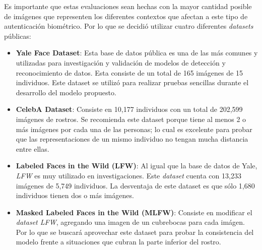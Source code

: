 \documentclass[letterpaper, 10 pt, conference]{ieeeconf}  %
\begin{document}
    Es importante que estas evaluaciones sean hechas con la mayor cantidad posible de imágenes que
    representen los diferentes contextos que afectan a este tipo de autenticación biométrico. Por
    lo que se decidió utilizar cuatro diferentes \textit{datasets} públicas:
    \begin{itemize}
        \item \textbf{Yale Face Dataset}: Esta base de datos pública es una de las más comunes y
            utilizadas para investigación y validación de modelos de detección y reconocimiento de
            datos. Esta consiste de un total de 165 imágenes de 15 individuos. Este dataset se
            utilizó para realizar pruebas sencillas durante el desarrollo del modelo propuesto.
        \item \textbf{CelebA Dataset}\cite{CELEBA}: Consiste en 10,177 individuos con un total de
            202,599 imágenes de rostros. Se recomienda este dataset porque tiene al menos 2 o más
            imágenes por cada una de las personas; lo cual es excelente para probar que las
            representaciones de un mismo individuo no tengan mucha distancia entre ellas.
        \item \textbf{Labeled Faces in the Wild (LFW)}\cite{LFW}: Al igual que la base de datos de
            Yale, \textit{LFW} es muy utilizado en investigaciones. Este \textit{dataset} cuenta
            con 13,233 imágenes de 5,749 individuos. La desventaja de este dataset es que sólo
            1,680 individuos tienen dos o más imágenes.
        \item \textbf{Masked Labeled Faces in the Wild (MLFW)}\cite{MLFW}: Consiste en modificar el
            \textit{dataset LFW}, agregando una imagen de un cubrebocas para cada imágen. Por lo
            que se buscará aprovechar este dataset para probar la consistencia del modelo frente
            a situaciones que cubran la parte inferior del rostro.
    \end{itemize}
\end{document}
